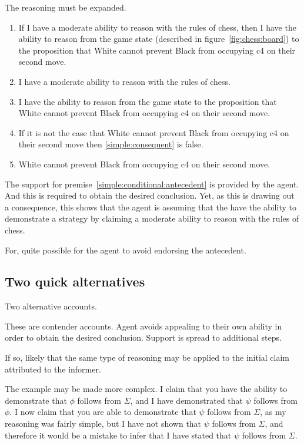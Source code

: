\documentclass[10pt]{article}
\begin{document}
The reasoning must be expanded.

\begin{enumerate}
\item\label{simple:conditional:claim} If I have a moderate ability to reason with the rules of chess, then I have the ability to reason from the game state (described in figure~\ref{fig:chess:board}) to the proposition that White cannot prevent Black from occupying c4 on their second move.
\item\label{simple:conditional:antecedent} I have a moderate ability to reason with the rules of chess.
\item\label{simple:conditional:consequent} I have the ability to reason from the game state to the proposition that White cannot prevent Black from occupying c4 on their second move.
\item\label{simple:conditional:necessity} If it is not the case that White cannot prevent Black from occupying c4 on their second move then \ref{simple:consequent} is false.
\item\label{simple:conditional:focus} White cannot prevent Black from occupying c4 on their second move.
\end{enumerate}

The support for premise~\ref{simple:conditional:antecedent} is provided by the agent.
And this is required to obtain the desired conclusion.
Yet, as this is drawing out a consequence, this shows that the agent is assuming that the have the ability to demonstrate a strategy by claiming a moderate ability to reason with the rules of chess.

For, quite possible for the agent to avoid endorsing the antecedent.

\subsection{Two quick alternatives}
\label{sec:two-quick-altern}




Two alternative accounts.


These are contender accounts.
Agent avoids appealing to their own ability in order to obtain the desired conclusion.
Support is spread to additional steps.

If so, likely that the same type of reasoning may be applied to the initial claim attributed to the informer.



\begin{note}
  \begin{enumerate*}[label=(\roman*)]
  \item The example may be made more complex.
    I claim that you have the ability to demonstrate that \(\phi\) follows from \(\Sigma\), and I have demonstrated that \(\psi\) follows from \(\phi\).
    I now claim that you are able to demonstrate that \(\psi\) follows from \(\Sigma\), as my reasoning was fairly simple, but I have not shown that \(\psi\) follows from \(\Sigma\), and therefore it would be a mistake to infer that I have stated that \(\psi\) follows from \(\Sigma\).
  \end{enumerate*}
\end{note}
\end{document}

